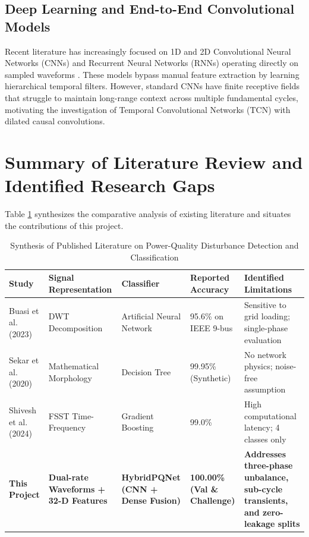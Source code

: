 \documentclass[12pt,a4paper]{report}
\begin{document}
\subsection{Deep Learning and End-to-End Convolutional Models}
Recent literature has increasingly focused on 1D and 2D Convolutional Neural Networks (CNNs) and Recurrent Neural Networks (RNNs) operating directly on sampled waveforms \cite{he2020, bai2021}. These models bypass manual feature extraction by learning hierarchical temporal filters. However, standard CNNs have finite receptive fields that struggle to maintain long-range context across multiple fundamental cycles, motivating the investigation of Temporal Convolutional Networks (TCN) with dilated causal convolutions.

\section{Summary of Literature Review and Identified Research Gaps}
Table \ref{tab:lit_comparison} synthesizes the comparative analysis of existing literature and situates the contributions of this project.

\begin{table}[H]
\centering
\caption{Synthesis of Published Literature on Power-Quality Disturbance Detection and Classification}
\label{tab:lit_comparison}
\small
\begin{tabularx}{\textwidth}{lXXXX}
\toprule
\textbf{Study} & \textbf{Signal Representation} & \textbf{Classifier} & \textbf{Reported Accuracy} & \textbf{Identified Limitations} \\
\midrule
Buasi et al. (2023) \cite{buasi2023} & DWT Decomposition & Artificial Neural Network & 95.6\% on IEEE 9-bus & Sensitive to grid loading; single-phase evaluation \\
Sekar et al. (2020) \cite{sekar2020} & Mathematical Morphology & Decision Tree & 99.95\% (Synthetic) & No network physics; noise-free assumption \\
Shivesh et al. (2024) \cite{shivesh2024} & FSST Time-Frequency & Gradient Boosting & 99.0\% & High computational latency; 4 classes only \\
\textbf{This Project} & \textbf{Dual-rate Waveforms + 32-D Features} & \textbf{HybridPQNet (CNN + Dense Fusion)} & \textbf{100.00\% (Val \& Challenge)} & \textbf{Addresses three-phase unbalance, sub-cycle transients, and zero-leakage splits} \\
\bottomrule
\end{tabularx}
\end{table}
\end{document}
